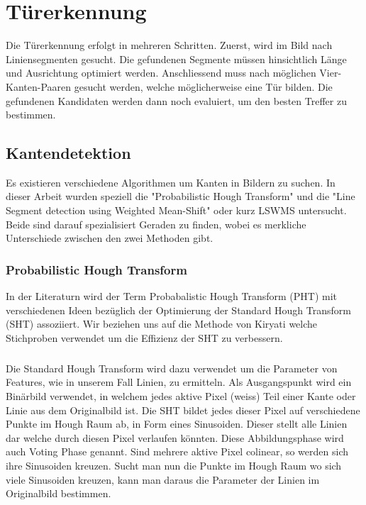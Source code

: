 \chapter{Türerkennung}

Die Türerkennung erfolgt in mehreren Schritten. Zuerst, wird im Bild nach Liniensegmenten gesucht. Die gefundenen Segmente müssen hinsichtlich Länge und Ausrichtung optimiert werden. Anschliessend muss nach möglichen Vier-Kanten-Paaren gesucht werden, welche möglicherweise eine Tür bilden. Die gefundenen Kandidaten werden dann noch evaluiert, um den besten Treffer zu bestimmen.

\section{Kantendetektion}

Es existieren verschiedene Algorithmen um Kanten in Bildern zu suchen. In dieser Arbeit wurden speziell die "Probabilistic Hough Transform" und die "Line Segment detection using Weighted Mean-Shift" oder kurz LSWMS untersucht. Beide sind darauf spezialisiert Geraden zu finden, wobei es merkliche Unterschiede zwischen den zwei Methoden gibt.

\subsection{Probabilistic Hough Transform}

In der Literaturn wird der Term Probabalistic Hough Transform (PHT) mit verschiedenen Ideen bezüglich der Optimierung der Standard Hough Transform (SHT) assoziiert. Wir beziehen uns auf die Methode von Kiryati \cite{kiryati} welche Stichproben verwendet um die Effizienz der SHT zu verbessern.
\paragraph{}
Die Standard Hough Transform wird dazu verwendet um die Parameter von Features, wie in unserem Fall Linien, zu ermitteln. Als Ausgangspunkt wird ein Binärbild verwendet, in welchem jedes aktive Pixel (weiss) Teil einer Kante oder Linie aus dem Originalbild ist. Die SHT bildet jedes dieser Pixel auf verschiedene Punkte im Hough Raum ab, in Form eines Sinusoiden. Dieser stellt alle Linien dar welche durch diesen Pixel verlaufen könnten. Diese Abbildungsphase wird auch Voting Phase genannt. Sind mehrere aktive Pixel colinear, so werden sich ihre Sinusoiden kreuzen. Sucht man nun die Punkte im Hough Raum wo sich viele Sinusoiden kreuzen, kann man daraus die Parameter der Linien im Originalbild bestimmen.
